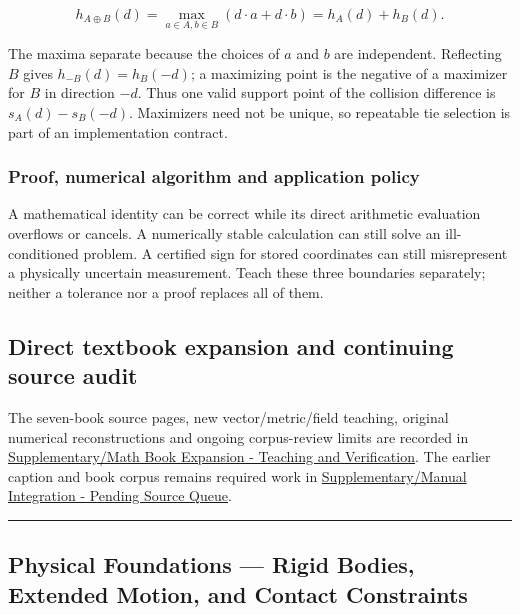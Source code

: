 \[
h_{A\oplus B}(d)=\max_{a\in A,b\in B}(d\cdot a+d\cdot b)
=h_A(d)+h_B(d).
\]

The maxima separate because the choices of \(a\) and \(b\) are independent. Reflecting \(B\) gives \(h_{-B}(d)=h_B(-d)\); a maximizing point is the negative of a maximizer for \(B\) in direction \(-d\). Thus one valid support point of the collision difference is \(s_A(d)-s_B(-d)\). Maximizers need not be unique, so repeatable tie selection is part of an implementation contract.

\subsubsection{Proof, numerical algorithm and application policy}\label{02-foundations-ii-ch039-proof-numerical-algorithm-and-application-policy}

A mathematical identity can be correct while its direct arithmetic evaluation overflows or cancels. A numerically stable calculation can still solve an ill-conditioned problem. A certified sign for stored coordinates can still misrepresent a physically uncertain measurement. Teach these three boundaries separately; neither a tolerance nor a proof replaces all of them.

\subsection{Direct textbook expansion and continuing source audit}\label{02-foundations-ii-ch039-direct-textbook-expansion-and-continuing-source-audit}

The seven-book source pages, new vector/metric/field teaching, original numerical reconstructions and ongoing corpus-review limits are recorded in \hyperref[appendix-5056f3debc1f]{Supplementary/Math Book Expansion - Teaching and Verification}. The earlier caption and book corpus remains required work in \hyperref[appendix-ac1f51db5e9a]{Supplementary/Manual Integration - Pending Source Queue}.

\begin{center}\rule{0.5\linewidth}{0.5pt}\end{center}

\subsection{Physical Foundations --- Rigid Bodies, Extended Motion, and Contact Constraints}\label{02-foundations-ii-ch039-physical-foundations-rigid-bodies-extended-motion-and-contact-constraints}

